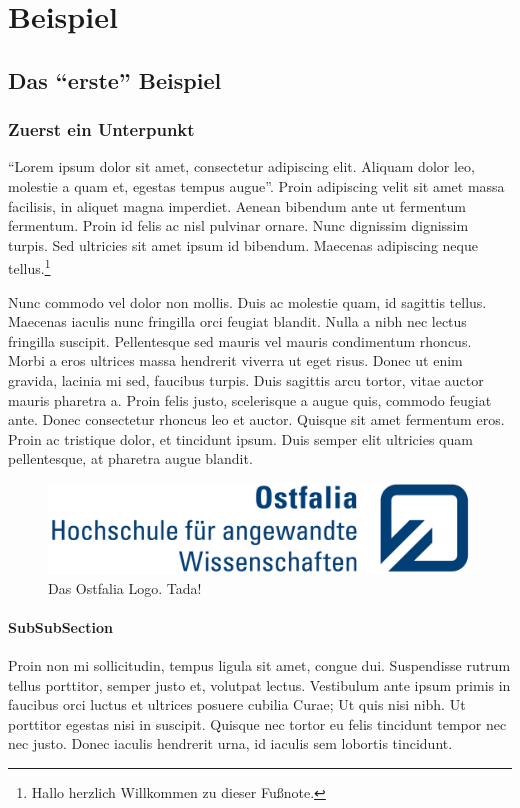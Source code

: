 \chapter{Beispiel}

\section{Das \enquote{erste} Beispiel}

\subsection{Zuerst ein Unterpunkt}
\enquote{Lorem ipsum dolor sit amet, consectetur adipiscing elit. Aliquam dolor leo, molestie a quam et, egestas tempus augue}. Proin adipiscing velit sit amet massa facilisis, in aliquet magna imperdiet. Aenean bibendum ante ut fermentum fermentum. Proin id felis ac nisl pulvinar ornare. Nunc dignissim dignissim turpis. Sed ultricies sit amet ipsum id bibendum. Maecenas adipiscing neque tellus.\footnote{Hallo herzlich Willkommen zu dieser Fußnote.}

Nunc commodo vel dolor non mollis. Duis ac molestie quam, id sagittis tellus. Maecenas iaculis nunc fringilla orci feugiat blandit. Nulla a nibh nec lectus fringilla suscipit. Pellentesque sed mauris vel mauris condimentum rhoncus. Morbi a eros ultrices massa hendrerit viverra ut eget risus. Donec ut enim gravida, lacinia mi sed, faucibus turpis. Duis sagittis arcu tortor, vitae auctor mauris pharetra a. Proin felis justo, scelerisque a augue quis, commodo feugiat ante. Donec consectetur rhoncus leo et auctor. Quisque sit amet fermentum eros. Proin ac tristique dolor, et tincidunt ipsum. Duis semper elit ultricies quam pellentesque, at pharetra augue blandit.

\begin{figure}
	\begin{center}
		\includegraphics{bilder/ostfalia_logo.jpg}
		\caption{Das Ostfalia Logo. Tada!}
	\end{center}
\end{figure}

\subsubsection{SubSubSection}
Proin non mi sollicitudin, tempus ligula sit amet, congue dui. Suspendisse rutrum tellus porttitor, semper justo et, volutpat lectus. Vestibulum ante ipsum primis in faucibus orci luctus et ultrices posuere cubilia Curae; Ut quis nisi nibh. Ut porttitor egestas nisi in suscipit. Quisque nec tortor eu felis tincidunt tempor nec nec justo. Donec iaculis hendrerit urna, id iaculis sem lobortis tincidunt.

